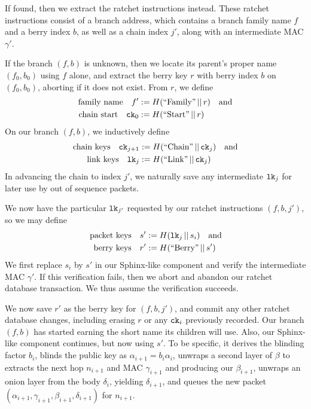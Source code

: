 \documentclass[twoside,letterpaper]{llncs}
\def\mathperiod{.}
\def\mathcomma{}
\def\mathperiod{}
\begin{document}
If found, then we extract the ratchet instructions instead.
These ratchet instructions consist of a branch address,
which contains a branch family name $f$ and a berry index $b$,
 as well as a chain index $j'$,
along with an intermediate MAC $\gamma'$.

If the branch $(f,b)$ is unknown, then we locate its parent's
proper name $(f_0,b_0)$ using $f$ alone, and extract the berry
key $r$ with berry index $b$ on $(f_0,b_0)$,
 aborting if it does not exist.
From $r$, we define
\[ \begin{aligned}
\textrm{family name}\quad
 f' &:= H(\textrm{``Family''} \,||\, r) \quad\textrm{and} \\ %
\textrm{chain start}\quad
 \ck_0 &:= H(\textrm{``Start''} \,||\, r) \mathperiod \\
\end{aligned} \]
On our branch $(f,b)$, we inductively define 
\[ \begin{aligned}
\textrm{chain keys}\quad
 \ck_{j+1} &:= H(\textrm{``Chain''} \,||\, \ck_j) \quad\textrm{and} \\ %
\textrm{link keys}\quad
 \lk_j &:= H(\textrm{``Link''} \,||\, \ck_j) \mathperiod \\
\end{aligned} \]
In advancing the chain to index $j'$, we naturally save any 
intermediate $\texttt{lk}_j$ for later use by out of sequence packets.

We now have the particular $\texttt{lk}_{j'}$ requested by our ratchet 
instructions $(f,b,j')$, so we may define 
\[ \begin{aligned}
\textrm{packet keys}\quad 
 s' &:= H(\lk_j \,||\, s_i) \quad\textrm{and} \\ %
\textrm{berry keys}\quad 
 r' &:= H(\textrm{``Berry''} \,||\, s') \mathperiod \\
\end{aligned} \]
We first replace $s_i$ by $s'$ in our Sphinx-like component
and verify the intermediate MAC $\gamma'$.  If this verification
fails, then we abort and abandon our ratchet database transaction.
We thus assume the verification succeeds.  

We now save $r'$ as the berry key for $(f,b,j')$, and commit any
other ratchet database changes, including erasing $r$ or any 
$\texttt{ck}_i$ previously recorded.  Our branch $(f,b)$ has started
earning the short name its children will use.  
Also, our Sphinx-like component continues, but now using $s'$.
To be specific, it derives the blinding factor $b_i$,
blinds the public key as $\alpha_{i+1} = b_i \alpha_i$,
unwraps a second layer of $\beta$ to extracts the
 next hop $n_{i+1}$ and MAC $\gamma_{i+1}$ and 
 producing our $\beta_{i+1}$,
unwraps an onion layer from the body $\delta_i$,
 yielding $\delta_{i+1}$, and queues the new packet
$(\alpha_{i+1},\gamma_{i+1},\beta_{i+1},\delta_{i+1})$ for $n_{i+1}$.
\end{document}
